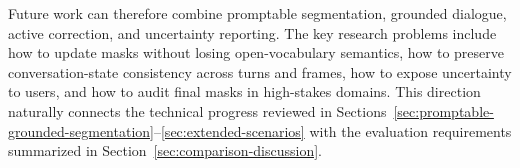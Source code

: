 Future work can therefore combine promptable segmentation, grounded dialogue, active correction, and uncertainty reporting. The key research problems include how to update masks without losing open-vocabulary semantics, how to preserve conversation-state consistency across turns and frames, how to expose uncertainty to users, and how to audit final masks in high-stakes domains. This direction naturally connects the technical progress reviewed in Sections~\ref{sec:promptable-grounded-segmentation}--\ref{sec:extended-scenarios} with the evaluation requirements summarized in Section~\ref{sec:comparison-discussion}.
